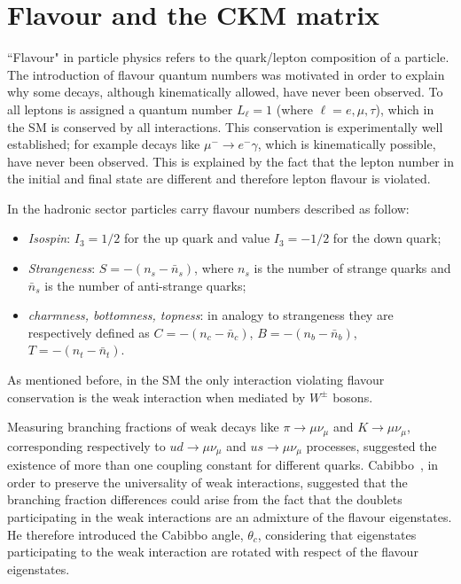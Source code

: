 \section{Flavour and the CKM matrix}
\label{sec:flavour}

``Flavour" in particle physics refers to the quark/lepton composition of a particle. The introduction of flavour quantum numbers
was motivated in order to explain why some decays, although kinematically allowed, have never been observed. To all leptons is
assigned a quantum number $L_\ell = 1$ (where $\ell = e,\mu,\tau$), which in the SM is conserved by all interactions.
This conservation is experimentally well established; for example decays like $\mu^- \rightarrow e^- \gamma $, which
is kinematically possible, have never been observed. This is explained by the fact that the lepton number in the initial
and final state are different and therefore lepton flavour is violated.

In the hadronic sector particles carry flavour numbers described as follow:

 \begin{itemize}
 \item \emph{Isospin}: $I_3 = 1/2$ for the up quark and value $I_3 = -1/2$ for the down quark;
 \item \emph{Strangeness}: $S = -(n_s - \bar{n}_s)$, where $n_s$ is the number of strange quarks and $\bar{n}_s$ is the number of anti-strange quarks;
 \item \emph{charmness, bottomness, topness}: in analogy to strangeness
 they are respectively defined as $C = -(n_c - \bar{n}_c)$, $B = -(n_b - \bar{n}_b)$, $T = -(n_t - \bar{n}_t)$.
 \end{itemize}

As mentioned before, in the SM the only interaction violating flavour conservation is the weak interaction
when mediated by $W^\pm$ bosons.

Measuring branching fractions of weak decays like $\pi \to \mu \nu_\mu$ and $K \to \mu \nu_\mu$, corresponding
respectively to $ud\to\mu\nu_\mu$ and $us\to\mu\nu_\mu$ processes, suggested the existence of more than one
coupling constant for different quarks. Cabibbo~\cite{PDG2014}, in order to preserve the universality
of weak interactions, suggested that the branching fraction differences could arise from the fact that
the doublets participating in the weak interactions are an admixture of the flavour eigenstates. He therefore introduced
the Cabibbo angle, $\theta_c$, considering that eigenstates participating to the weak interaction are rotated with respect
of the flavour eigenstates.


